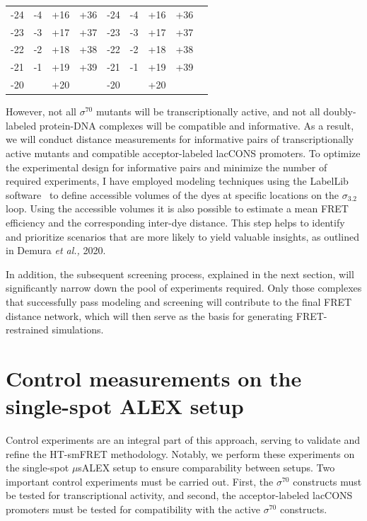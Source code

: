 \begin{table}[]
\begin{tabular}{@{}lllllllll@{}}
-24     & -4      & +16     & +36     & -24      & -4       & +16      & +36      &                         \\
-23     & -3      & +17     & +37     & -23      & -3       & +17      & +37      &                         \\
-22     & -2      & +18     & +38     & -22      & -2       & +18      & +38      &                         \\
-21     & -1      & +19     & +39     & -21      & -1       & +19      & +39      &                         \\
-20     &         & +20     &         & -20      &          & +20      &          &                         \\
\bottomrule
\end{tabular}
\end{table}

However, not all $\sigma^{70}$ mutants will be transcriptionally active, and not all doubly-labeled protein-DNA complexes will be compatible and informative. 
As a result, we will conduct distance measurements for informative pairs of transcriptionally active mutants and compatible acceptor-labeled \ac{lacCONS} promoters.
To optimize the experimental design for informative pairs and minimize the number of required experiments, I have employed modeling techniques using the LabelLib software~\cite{dimura_NatComm_2020} to define accessible volumes of the dyes at specific locations on the $\sigma_{3.2}$ loop.
Using the accessible volumes it is also possible to estimate a mean FRET efficiency and the corresponding inter-dye distance. 
This step helps to identify and prioritize scenarios that are more likely to yield valuable insights, as outlined in Demura \textit{et al.,} 2020.~\cite{dimura_NatComm_2020}

In addition, the subsequent screening process, explained in the next section, will significantly narrow down the pool of experiments required.
Only those complexes that successfully pass modeling and screening will contribute to the final FRET distance network, which will then serve as the basis for generating FRET-restrained simulations.

\section{Control measurements on the single-spot ALEX setup}
\label{se:controls_exp}

Control experiments are an integral part of this approach, serving to validate and refine the \ac{HT-smFRET} methodology. 
Notably, we perform these experiments on the single-spot $\mu$s\ac{ALEX} setup to ensure comparability between setups.
Two important control experiments must be carried out.
First, the $\sigma^{70}$ constructs must be tested for transcriptional activity, and second, the acceptor-labeled \ac{lacCONS} promoters must be tested for compatibility with the active $\sigma^{70}$ constructs. 

